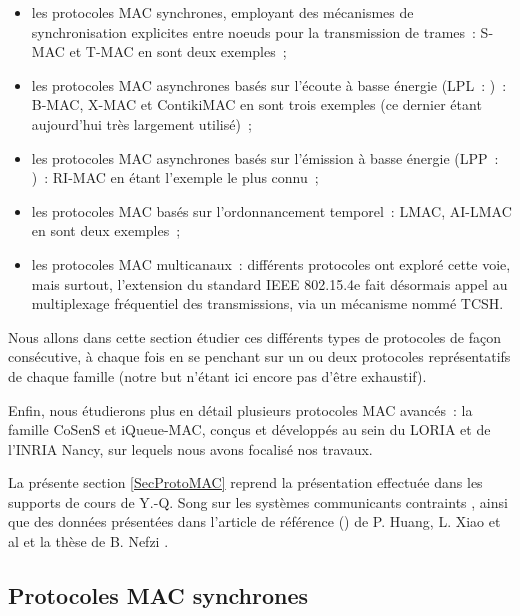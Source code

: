 \begin{itemize}

\item les protocoles MAC synchrones, employant des mécanismes de
synchronisation explicites entre noeuds pour la transmission de trames~:
S-MAC et T-MAC en sont deux exemples~;

\item les protocoles MAC asynchrones basés sur l'écoute à basse énergie
(LPL~: )~: B-MAC, X-MAC et ContikiMAC en sont
trois exemples (ce dernier étant aujourd'hui très largement utilisé)~;

\item les protocoles MAC asynchrones basés sur l'émission à basse énergie
(LPP~: )~: RI-MAC en étant l'exemple le plus connu~;

\item les protocoles MAC basés sur l'ordonnancement temporel~: LMAC,
AI-LMAC en sont deux exemples~;

\item les protocoles MAC multicanaux~: différents protocoles ont exploré
cette voie, mais surtout, l'extension du standard IEEE 802.15.4e fait
désormais appel au multiplexage fréquentiel des transmissions, via un
mécanisme nommé TCSH.

\end{itemize}

Nous allons dans cette section étudier ces différents types de protocoles
de façon consécutive, à chaque fois en se penchant sur un ou deux
protocoles représentatifs de chaque famille (notre but n'étant ici
encore pas d'être exhaustif).

Enfin, nous étudierons plus en détail plusieurs protocoles MAC avancés~:
la famille CoSenS et iQueue-MAC, conçus et développés au sein du LORIA
et de l'INRIA Nancy, sur lequels nous avons focalisé nos travaux.

La présente section \ref{SecProtoMAC} reprend la présentation effectuée dans
les supports de cours de Y.-Q. Song sur les systèmes communicants contraints
\cite{coursEnsem}, ainsi que des données présentées dans l'article de
référence () de P. Huang, L. Xiao et al
\cite{Evolution-MAC-WSN-Survey-2013} et la thèse de B. Nefzi
\cite{TheseBNefzi}.


\subsection{Protocoles MAC synchrones}
\label{SubsecProtoMACSynchrones}


